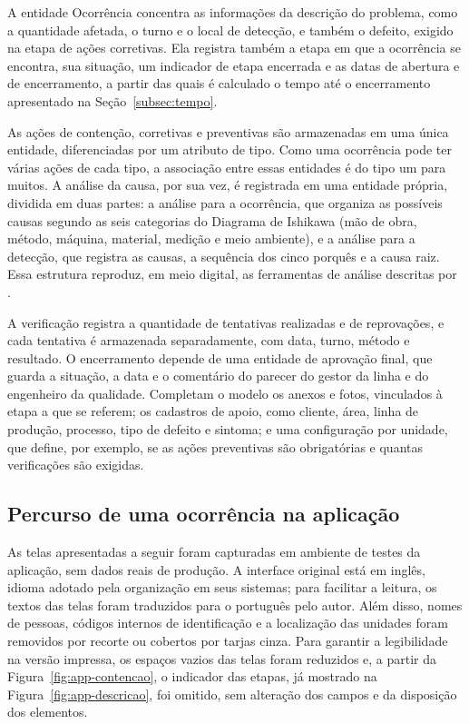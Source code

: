 

A entidade Ocorrência concentra as informações da descrição do problema, como a quantidade afetada, o turno e o local de detecção, e também o defeito, exigido na etapa de ações corretivas. Ela registra também a etapa em que a ocorrência se encontra, sua situação, um indicador de etapa encerrada e as datas de abertura e de encerramento, a partir das quais é calculado o tempo até o encerramento apresentado na Seção~\ref{subsec:tempo}.

As ações de contenção, corretivas e preventivas são armazenadas em uma única entidade, diferenciadas por um atributo de tipo. Como uma ocorrência pode ter várias ações de cada tipo, a associação entre essas entidades é do tipo um para muitos. A análise da causa, por sua vez, é registrada em uma entidade própria, dividida em duas partes: a análise para a ocorrência, que organiza as possíveis causas segundo as seis categorias do Diagrama de Ishikawa (mão de obra, método, máquina, material, medição e meio ambiente), e a análise para a detecção, que registra as causas, a sequência dos cinco porquês e a causa raiz. Essa estrutura reproduz, em meio digital, as ferramentas de análise descritas por .

A verificação registra a quantidade de tentativas realizadas e de reprovações, e cada tentativa é armazenada separadamente, com data, turno, método e resultado. O encerramento depende de uma entidade de aprovação final, que guarda a situação, a data e o comentário do parecer do gestor da linha e do engenheiro da qualidade. Completam o modelo os anexos e fotos, vinculados à etapa a que se referem; os cadastros de apoio, como cliente, área, linha de produção, processo, tipo de defeito e sintoma; e uma configuração por unidade, que define, por exemplo, se as ações preventivas são obrigatórias e quantas verificações são exigidas.

\subsection{Percurso de uma ocorrência na aplicação}
\label{subsec:percurso}

As telas apresentadas a seguir foram capturadas em ambiente de testes da aplicação, sem dados reais de produção. A interface original está em inglês, idioma adotado pela organização em seus sistemas; para facilitar a leitura, os textos das telas foram traduzidos para o português pelo autor. Além disso, nomes de pessoas, códigos internos de identificação e a localização das unidades foram removidos por recorte ou cobertos por tarjas cinza. Para garantir a legibilidade na versão impressa, os espaços vazios das telas foram reduzidos e, a partir da Figura~\ref{fig:app-contencao}, o indicador das etapas, já mostrado na Figura~\ref{fig:app-descricao}, foi omitido, sem alteração dos campos e da disposição dos elementos.

